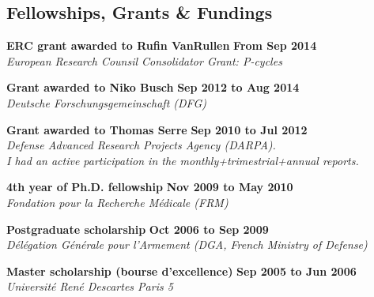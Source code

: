\documentclass[margin,line]{resume}
\begin{document}
\begin{resume}
	\vspace{3mm}
	\section{\mysidestyle Fellowships, Grants \& Fundings}

	\textbf{ERC grant awarded to Rufin VanRullen} \hfill \textbf{From Sep 2014}\\
	\textsl{European Research Counsil Consolidator Grant: P-cycles}

	\textbf{Grant awarded to Niko Busch} \hfill \textbf{Sep 2012 to Aug 2014}\\
	\textsl{Deutsche Forschungsgemeinschaft (DFG)}

	\textbf{Grant awarded to Thomas Serre} \hfill \textbf{Sep 2010 to Jul 2012}\\
	\textsl{Defense Advanced Research Projects Agency (DARPA).\\ I had an active participation in the monthly+trimestrial+annual reports.}
	
	\textbf{4th year of Ph.D. fellowship} \hfill \textbf{Nov 2009 to May 2010}\\
	\textsl{Fondation pour la Recherche Médicale (FRM)}	
	
	\textbf{Postgraduate scholarship} \hfill \textbf{Oct 2006 to Sep 2009}\\ %
	\textsl{Délégation Générale pour l'Armement (DGA, French Ministry of Defense)}

	\textbf{Master scholarship (bourse d’excellence)} \hfill \textbf{Sep 2005 to Jun 2006}\\
	\textsl{Université René Descartes Paris 5}


%
%
%


\end{resume}
\end{document}
